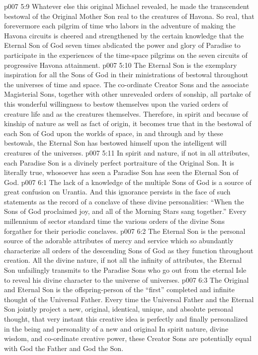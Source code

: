 \vs p007 5:9 Whatever else this original Michael revealed, he made the transcendent bestowal of the Original Mother Son real to the creatures of Havona. So real, that forevermore each pilgrim of time who labors in the adventure of making the Havona circuits is cheered and strengthened by the certain knowledge that the Eternal Son of God seven times abdicated the power and glory of Paradise to participate in the experiences of the time\hyp{}space pilgrims on the seven circuits of progressive Havona attainment.
\pc \vs p007 5:10 The Eternal Son is the exemplary inspiration for all the Sons of God in their ministrations of bestowal throughout the universes of time and space. The co\hyp{}ordinate Creator Sons and the associate Magisterial Sons, together with other unrevealed orders of sonship, all partake of this wonderful willingness to bestow themselves upon the varied orders of creature life and as the creatures themselves. Therefore, in spirit and because of kinship of nature as well as fact of origin, it becomes true that in the bestowal of each Son of God upon the worlds of space, in and through and by these bestowals, the Eternal Son has bestowed himself upon the intelligent will creatures of the universes.\plusone
\vs p007 5:11 In spirit and nature, if not in all attributes, each Paradise Son is a divinely perfect portraiture of the Original Son. It is literally true, whosoever has seen a Paradise Son has seen the Eternal Son of God.
\vs p007 6:1 The lack of a knowledge of the multiple Sons of God is a source of great confusion on Urantia. And this ignorance persists in the face of such statements as the record of a conclave of these divine personalities: “When the Sons of God proclaimed joy, and all of the Morning Stars sang together.” Every millennium of sector standard time the various orders of the divine Sons forgather for their periodic conclaves.
\vs p007 6:2 The Eternal Son is the personal source of the adorable attributes of mercy and service which so abundantly characterize all orders of the descending Sons of God as they function throughout creation. All the divine nature, if not all the infinity of attributes, the Eternal Son unfailingly transmits to the Paradise Sons who go out from the eternal Isle to reveal his divine character to the universe of universes.
\pc \vs p007 6:3 The Original and Eternal Son is the offspring\hyp{}person of the “first” completed and infinite thought of the Universal Father. Every time the Universal Father and the Eternal Son jointly project a new, original, identical, unique, and absolute personal thought, that very instant this creative idea is perfectly and finally personalized in the being and personality of a new and original  In spirit nature, divine wisdom, and co\hyp{}ordinate creative power, these Creator Sons are potentially equal with God the Father and God the Son.
